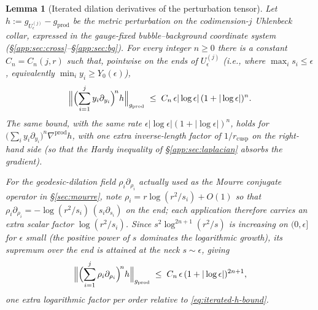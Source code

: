 \documentclass[11pt,letterpaper]{article}
\newtheorem{lemma}[theorem]{Lemma}
\theoremstyle{definition}
\begin{document}
\begin{lemma}[Iterated dilation derivatives of the perturbation tensor]\label{app:lem:iterated-h}
Let $h := g_{U_\epsilon^{(j)}} - g_{\mathrm{prod}}$ be the metric perturbation on the codimension-$j$ Uhlenbeck collar, expressed in the gauge-fixed bubble--background coordinate system (\S\ref{app:sec:cross}--\S\ref{app:sec:bg}). For every integer $n\ge 0$ there is a constant $C_n = C_n(j, r)$ such that, pointwise on the ends of $U_\epsilon^{(j)}$ (i.e., where $\max_i s_i \le \epsilon$, equivalently $\min_i y_i \ge Y_0(\epsilon)$),
\begin{equation}\label{eq:iterated-h-bound}
\Bigl\|\Bigl(\sum_{i=1}^j y_i\partial_{y_i}\Bigr)^{\!n} h\Bigr\|_{g_{\mathrm{prod}}} \;\le\; C_n\,\epsilon|\log\epsilon|\,(1+|\log\epsilon|)^n.
\end{equation}
The same bound, with the same rate $\epsilon|\log\epsilon|(1+|\log\epsilon|)^n$, holds for $\bigl(\sum_i y_i\partial_{y_i}\bigr)^n \nabla^{\mathrm{prod}} h$, with one extra inverse-length factor of $1/r_{\mathrm{cusp}}$ on the right-hand side (so that the Hardy inequality of \S\ref{app:sec:laplacian} absorbs the gradient).

For the \emph{geodesic-dilation} field $\rho_i\partial_{\rho_i}$ actually used as the Mourre conjugate operator in \S\ref{sec:mourre}, note $\rho_i = r\log(r^2/s_i) + O(1)$ so that $\rho_i\partial_{\rho_i} = -\log(r^2/s_i)\,(s_i\partial_{s_i})$ on the end; each application therefore carries an extra scalar factor $\log(r^2/s_i)$. Since $s^2\log^{2n+1}(r^2/s)$ is increasing on $(0,\epsilon]$ for $\epsilon$ small (the positive power of $s$ dominates the logarithmic growth), its supremum over the end is attained at the neck $s\sim\epsilon$, giving
\begin{equation}\label{eq:iterated-h-bound-geodesic}
\Bigl\|\Bigl(\sum_{i=1}^j \rho_i\partial_{\rho_i}\Bigr)^{\!n} h\Bigr\|_{g_{\mathrm{prod}}} \;\le\; C_n\,\epsilon\,(1+|\log\epsilon|)^{2n+1},
\end{equation}
one extra logarithmic factor per order relative to \eqref{eq:iterated-h-bound}.
\end{lemma}
\end{document}

